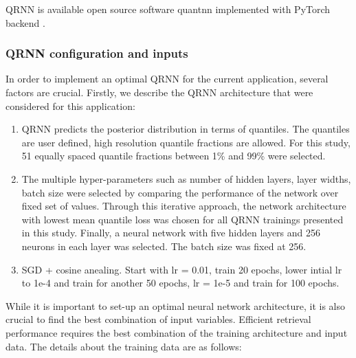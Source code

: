 \documentclass[amt, manuscript]{copernicus}
\newcommand{\todo}[1]{{\color{red} #1}}
\begin{document}
QRNN is available open source software quantnn \citep{} implemented with PyTorch backend \citep{paszke2017automatic}.


\subsubsection{QRNN configuration and inputs}

In order to implement an optimal QRNN for the current application, several factors are crucial. Firstly, we describe the QRNN architecture that were considered for this application:

	\begin{enumerate}	
	
	\item QRNN predicts the posterior distribution in terms of quantiles. The quantiles are user defined, high resolution quantile fractions are allowed. For this study, 51 equally spaced quantile fractions between 1\% and 99\% were selected. 	
	
	\item The multiple hyper-parameters such as number of hidden layers, layer widths, batch size were selected by comparing the performance of the network over fixed set of values. Through this iterative approach, the network architecture with lowest mean quantile loss was chosen for all QRNN trainings presented in this study. Finally, a neural network with five hidden layers and 256 neurons in each layer was selected. The batch size was fixed at 256. 
	
	\item \todo {SGD + cosine anealing. Start with lr = 0.01, train 20 epochs,  lower intial lr to 1e-4 and train for another 50 epochs, lr = 1e-5 and train for 100 epochs.}	
	
	
\end{enumerate}

While it is important to set-up an optimal neural network architecture, it is also crucial to find the best combination of input variables. Efficient retrieval performance requires the best combination of the training architecture and input data. The details about the training data are as follows: 
\end{document}
